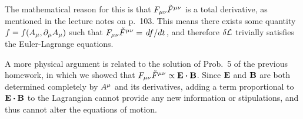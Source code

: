 {		The mathematical reason for this is that $F_{\mu \nu} \tilde{F}^{\mu \nu}$ is a total derivative, as mentioned in the lecture notes on p.~103.  This means there exists some quantity $f = f(A_\mu, \partial_\mu A_\mu)$ such that $F_{\mu \nu} \tilde{F}^{\mu \nu} = \dv*{f}{t}$, and therefore $\delta \mathcal{L}$ trivially satisfies the Euler-Lagrange equations.
		
		A more physical argument is related to the solution of Prob.~5 of the previous homework, in which we showed that $\Fsmn \Ftmn \propto \vE \vdot \vB$.  Since $\vb{E}$ and $\vb{B}$ are both determined completely by $A^\mu$ and its derivatives, adding a term proportional to $\vE \vdot \vB$ to the Lagrangian cannot provide any new information or stipulations, and thus cannot alter the equations of motion.
}